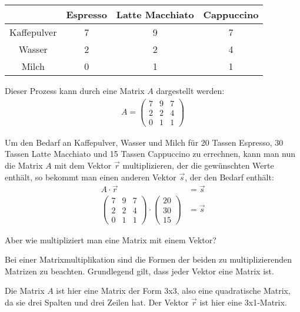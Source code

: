 \begin{center}
\begin{tabular}{c|c|c|c}
& Espresso & Latte Macchiato & Cappuccino \\
\hline
Kaffepulver & 7 & 9 & 7 \\
\hline
Wasser & 2 & 2 & 4 \\
\hline
Milch & 0 & 1 & 1 \\
\end{tabular}
\end{center}

\begin{flushleft}
Dieser Prozess kann durch eine Matrix $A$ dargestellt werden:
\begin{align}
    A = \begin{pmatrix}
        7 & 9 & 7 \\
        2 & 2 & 4 \\
        0 & 1 & 1
    \end{pmatrix}
\end{align}

Um den Bedarf an Kaffepulver, Wasser und Milch für 20 Tassen Espresso, 30 Tassen Latte Macchiato und 15 Tassen Cappuccino zu errechnen,
kann man nun die Matrix $A$ mit dem Vektor $\vec{r}$ multiplizieren, der die gewünschten Werte enthält,
so bekommt man einen anderen Vektor $\vec{s}$, der den Bedarf enthält:
\begin{align}
    A\cdot\vec{r}&=\vec{s} \\
    \begin{pmatrix}
        7 & 9 & 7 \\
        2 & 2 & 4 \\
        0 & 1 & 1
    \end{pmatrix}\cdot
    \begin{pmatrix}
        20 \\
        30 \\
        15
    \end{pmatrix}&=\vec{s}
\end{align}

Aber wie multipliziert man eine Matrix mit einem Vektor?
\newline

Bei einer Matrixmultiplikation sind die Formen der beiden zu multiplizierenden Matrizen zu beachten.
Grundlegend gilt, dass jeder Vektor eine Matrix ist.

Die Matrix $A$ ist hier eine Matrix der Form 3x3, also eine quadratische Matrix, da sie drei Spalten und drei Zeilen hat.
Der Vektor $\vec{r}$ ist hier eine 3x1-Matrix.


\end{flushleft}
